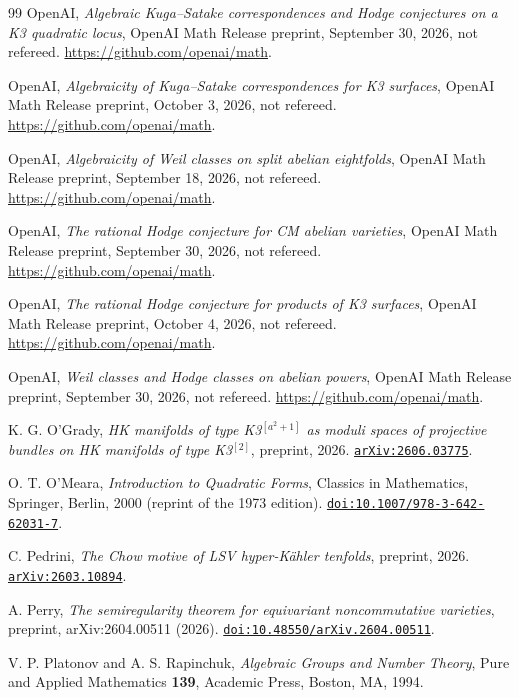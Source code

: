 \begin{thebibliography}{99}
OpenAI,
\emph{Algebraic Kuga--Satake correspondences and Hodge conjectures on a K3 quadratic locus},
OpenAI Math Release preprint, September 30, 2026, not refereed.
\url{https://github.com/openai/math}.

OpenAI,
\emph{Algebraicity of Kuga--Satake correspondences for K3 surfaces},
OpenAI Math Release preprint, October 3, 2026, not refereed.
\url{https://github.com/openai/math}.

OpenAI,
\emph{Algebraicity of Weil classes on split abelian eightfolds},
OpenAI Math Release preprint, September 18, 2026, not refereed.
\url{https://github.com/openai/math}.

OpenAI,
\emph{The rational Hodge conjecture for CM abelian varieties},
OpenAI Math Release preprint, September 30, 2026, not refereed.
\url{https://github.com/openai/math}.

OpenAI,
\emph{The rational Hodge conjecture for products of K3 surfaces},
OpenAI Math Release preprint, October 4, 2026, not refereed.
\url{https://github.com/openai/math}.

OpenAI,
\emph{Weil classes and Hodge classes on abelian powers},
OpenAI Math Release preprint, September 30, 2026, not refereed.
\url{https://github.com/openai/math}.

K. G. O'Grady,
\emph{HK manifolds of type K3$^{[a^{2}+1]}$ as moduli spaces of projective
bundles on HK manifolds of type K3$^{[2]}$},
preprint, 2026.
\href{https://arxiv.org/abs/2606.03775}{\texttt{arXiv:2606.03775}}.

O. T. O'Meara,
\emph{Introduction to Quadratic Forms},
Classics in Mathematics, Springer, Berlin, 2000 (reprint of the 1973 edition).
\href{https://doi.org/10.1007/978-3-642-62031-7}{\texttt{doi:10.1007/978-3-642-62031-7}}.

C. Pedrini,
\emph{The Chow motive of LSV hyper-K\"ahler tenfolds},
preprint, 2026.
\href{https://arxiv.org/abs/2603.10894}{\texttt{arXiv:2603.10894}}.

A. Perry,
\emph{The semiregularity theorem for equivariant noncommutative varieties},
preprint, arXiv:2604.00511 (2026).
\href{https://doi.org/10.48550/arXiv.2604.00511}{\texttt{doi:10.48550/arXiv.2604.00511}}.

V. P. Platonov and A. S. Rapinchuk,
\emph{Algebraic Groups and Number Theory},
Pure and Applied Mathematics \textbf{139},
Academic Press, Boston, MA, 1994.


\end{thebibliography}
